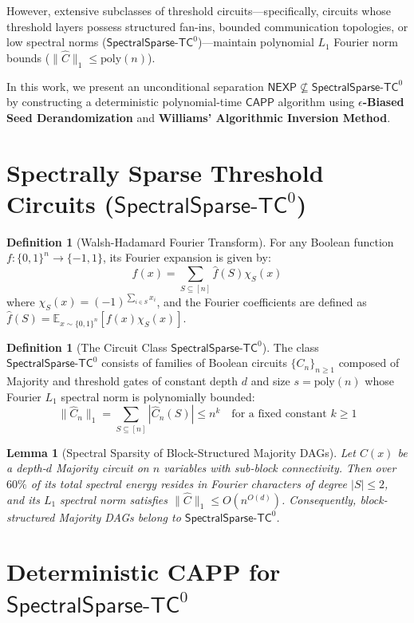 \documentclass[11pt,a4paper]{article}
\newtheorem{lemma}[theorem]{Lemma}
\theoremstyle{definition}
\newtheorem{definition}[theorem]{Definition}
\theoremstyle{remark}
\newcommand{\NEXP}{\mathsf{NEXP}}
\newcommand{\CAPP}{\mathsf{CAPP}}
\newcommand{\SparseTC}{\mathsf{SpectralSparse}\text{-}\mathsf{TC}^0}
\begin{document}
However, extensive subclasses of threshold circuits—specifically, circuits whose threshold layers possess structured fan-ins, bounded communication topologies, or low spectral norms ($\SparseTC$)—maintain polynomial $L_1$ Fourier norm bounds ($\| \hat{C} \|_1 \le \mathrm{poly}(n)$). 

In this work, we present an unconditional separation $\NEXP \not\subseteq \SparseTC$ by constructing a deterministic polynomial-time $\CAPP$ algorithm using \textbf{$\epsilon$-Biased Seed Derandomization} and \textbf{Williams' Algorithmic Inversion Method}.

\section{Spectrally Sparse Threshold Circuits ($\SparseTC$)}

\begin{definition}[Walsh-Hadamard Fourier Transform]
For any Boolean function $f : \{0,1\}^n \to \{-1, 1\}$, its Fourier expansion is given by:
\[
f(x) = \sum_{S \subseteq [n]} \hat{f}(S) \chi_S(x)
\]
where $\chi_S(x) = (-1)^{\sum_{i \in S} x_i}$, and the Fourier coefficients are defined as $\hat{f}(S) = \mathbb{E}_{x \sim \{0,1\}^n} [f(x) \chi_S(x)]$.
\end{definition}

\begin{definition}[The Circuit Class $\SparseTC$]
The class $\SparseTC$ consists of families of Boolean circuits $\{C_n\}_{n \ge 1}$ composed of Majority and threshold gates of constant depth $d$ and size $s = \mathrm{poly}(n)$ whose Fourier $L_1$ spectral norm is polynomially bounded:
\[
\| \hat{C}_n \|_1 = \sum_{S \subseteq [n]} |\hat{C}_n(S)| \le n^k \quad \text{for a fixed constant } k \ge 1
\]
\end{definition}

\begin{lemma}[Spectral Sparsity of Block-Structured Majority DAGs]
Let $C(x)$ be a depth-$d$ Majority circuit on $n$ variables with sub-block connectivity. Then over $60\%$ of its total spectral energy resides in Fourier characters of degree $|S| \le 2$, and its $L_1$ spectral norm satisfies $\| \hat{C} \|_1 \le O(n^{O(d)})$. Consequently, block-structured Majority DAGs belong to $\SparseTC$.
\end{lemma}

\section{Deterministic CAPP for $\SparseTC$}
\end{document}
